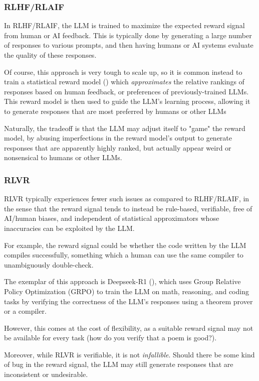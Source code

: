 \documentclass{article} %
\begin{document}
\subsubsection{RLHF/RLAIF}
In RLHF/RLAIF, the LLM is trained to maximize the expected reward signal from human or AI feedback.
This is typically done by generating a large number of responses to various prompts,
and then having humans or AI systems evaluate the quality of these responses.

Of course, this approach is very tough to scale up,
so it is common instead to train a statistical reward model (\cite{Zhu-et-al-2024})
which \textit{approximates} the relative rankings of responses based on human feedback,
or preferences of previously-trained LLMs.
This reward model is then used to guide the LLM's learning process,
allowing it to generate responses that are most preferred by humans or other LLMs

Naturally, the tradeoff is that the LLM may adjust itself to "game" the reward model,
by abusing imperfections in the reward model's output to generate responses that are apparently highly ranked,
but actually appear weird or nonsensical to humans or other LLMs.

\subsubsection{RLVR}
RLVR typically experiences fewer such issues as compared to RLHF/RLAIF,
in the sense that the reward signal tends to instead be rule-based, verifiable,
free of AI/human biases, and independent of statistical approximators
whose inaccuracies can be exploited by the LLM.

For example, the reward signal could be whether the code written by the LLM compiles successfully,
something which a human can use the same compiler to unambiguously double-check.

The exemplar of this approach is Deepseek-R1 (\cite{Deepseek-2024}),
which uses Group Relative Policy Optimization (GRPO) to train the LLM on math, reasoning, 
and coding tasks by verifying the correctness of the LLM's responses using a theorem prover
or a compiler.

However, this comes at the cost of flexibility, as a suitable reward signal
may not be available for every task (how do you verify that a poem is good?).

Moreover, while RLVR is verifiable, it is not \textit{infallible}.
Should there be some kind of bug in the reward signal,
the LLM may still generate responses that are inconsistent or undesirable.
\end{document}
